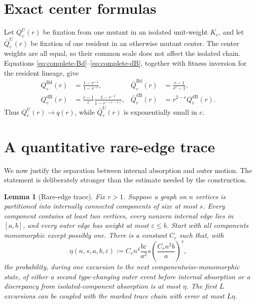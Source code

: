 \documentclass[11pt]{article}
\newtheorem{lemma}[theorem]{Lemma}
\theoremstyle{definition}
\theoremstyle{remark}
\newcommand{\Bd}{\mathrm{Bd}}
\newcommand{\dB}{\mathrm{dB}}
\newcommand{\eps}{\varepsilon}
\begin{document}
\section{Exact center formulas}

Let $Q_c^U(r)$ be fixation from one mutant in an isolated unit-weight
$K_c$, and let $\bar Q_c^U(r)$ be fixation of one resident in an otherwise
mutant center.  The center weights are all equal, so their common scale does
not affect the isolated chain.  Equations
\eqref{eq:complete-Bd}--\eqref{eq:complete-dB}, together with fitness
inversion for the resident lineage, give
\begin{align}
 Q_c^{\Bd}(r)&=\frac{1-r^{-1}}{1-r^{-c}},
 &\bar Q_c^{\Bd}(r)&=\frac{r-1}{r^c-1},
 \label{eq:center-Bd}\\
 Q_c^{\dB}(r)&=\frac{c-1}{c}\frac{1-r^{-1}}{1-r^{-(c-1)}},
 &\bar Q_c^{\dB}(r)&=r^{2-c}Q_c^{\dB}(r).
 \label{eq:center-dB}
\end{align}
Thus $Q_c^U(r)\to q(r)$, while $\bar Q_c^U(r)$ is exponentially small in
$c$.

\section{A quantitative rare-edge trace}

We now justify the separation between internal absorption and outer motion.
The statement is deliberately stronger than the estimate needed by the
construction.

\begin{lemma}[Rare-edge trace]
\label{lem:rare-edge}
Fix $r>1$.  Suppose a graph on $n$ vertices is partitioned into internally
connected components of size at most $s$.  Every component contains at least
two vertices, every nonzero internal edge lies in $[a,b]$, and every outer
edge has weight at most $\eps\leq b$.  Start with all components monomorphic
except possibly one.  There is a constant $C_r$ such that, with
\begin{equation}
 \eta(n,s,a,b,\eps)
 :=C_rn^4\frac{b\eps}{a^2}s
 \left(\frac{C_rn^2b}{a}\right)^s,
 \label{eq:eta}
\end{equation}
the probability, during one excursion to the next componentwise-monomorphic
state, of either a second type-changing outer event before internal absorption
or a discrepancy from isolated-component absorption is at most $\eta$.
The first $L$ excursions can be coupled with the marked trace chain with
error at most $L\eta$.
\end{lemma}
\end{document}
